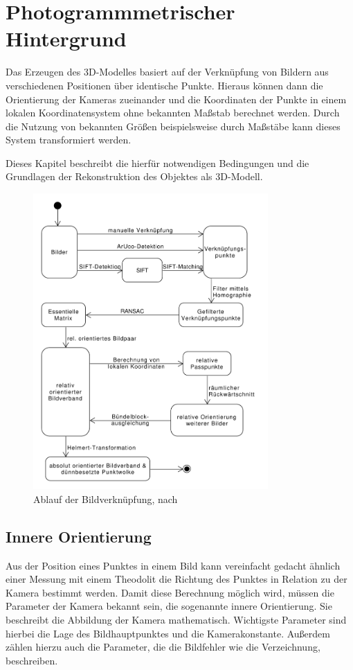 \documentclass[./00_PhotoBox.tex]{subfiles}
\begin{document}
\chapter{Photogrammmetrischer Hintergrund}
\label{c:photogrammmetrie}
Das Erzeugen des 3D-Modelles basiert auf der Verknüpfung von Bildern aus verschiedenen Positionen über identische Punkte. Hieraus können dann die Orientierung der Kameras zueinander und die Koordinaten der Punkte in einem lokalen Koordinatensystem ohne bekannten Maßstab berechnet werden. Durch die Nutzung von bekannten Größen beispielsweise durch Maßstäbe kann dieses System transformiert werden.

Dieses Kapitel beschreibt die hierfür notwendigen Bedingungen und die Grundlagen der Rekonstruktion des Objektes als 3D-Modell.

\begin{figure}
    \centering
    \includegraphics[width=0.8\textwidth]{./img/Ablauf.pdf}
    \centering
    \caption{Ablauf der Bildverknüpfung, nach \citealt[S. 492]{luhmann}} %
    \label{img:ablauf} %
\end{figure}

\section{Innere Orientierung}
\label{s:innereorientierung}
Aus der Position eines Punktes in einem Bild kann vereinfacht gedacht ähnlich einer Messung mit einem Theodolit die Richtung des Punktes in Relation zu der Kamera bestimmt werden. Damit diese Berechnung möglich wird, müssen die Parameter der Kamera bekannt sein, die sogenannte innere Orientierung. Sie beschreibt die Abbildung der Kamera mathematisch. Wichtigste Parameter sind hierbei die Lage des Bildhauptpunktes und die Kamerakonstante. Außerdem zählen hierzu auch die Parameter, die die Bildfehler wie die Verzeichnung, beschreiben. \citep[S. 179f]{luhmann}
\end{document}

